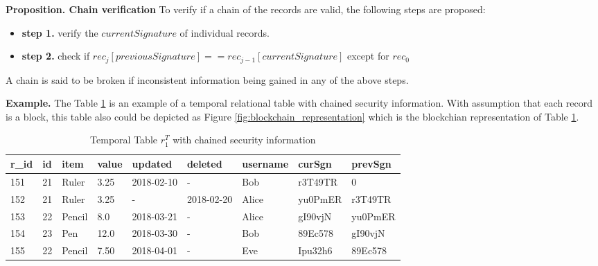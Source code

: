 \textbf{Proposition. Chain verification}
To verify if a chain of the records are valid, the following steps are proposed:

\begin{itemize}
	\item \textbf{step 1.} verify the $currentSignature$ of individual records.
	\item \textbf{step 2.} check if $rec_j[previousSignature] == rec_{j-1}[currentSignature]$ except for $rec_0$
\end{itemize}

A chain is said to be broken if inconsistent information being gained in any of the above steps.

\textbf{Example.} The Table \ref{temporal_blockchain_table} is an example of a temporal relational table with chained security information. With assumption that each record is a block, this table also could be depicted as Figure \ref{fig:blockchain_representation} which is the blockchian representation of Table \ref{temporal_blockchain_table}.

\begin{center}
\begin{table}
	\centering
	\footnotesize
	\caption{Temporal Table $r_1^T$ with chained security information}
	\label{temporal_blockchain_table}
	\begin{tabular}{p{0.5cm}p{0.5cm}p{1cm}p{0.5cm}p{1.7cm}p{1.7cm}p{1.5cm}p{1.5cm}p{1.5cm}}
		\hline
		r\_id & id & item      & value  & updated  & deleted & username & curSgn & prevSgn \\ \hline
		151& 21 & Ruler    & 3.25  & 2018-02-10  &  - & Bob &r3T49TR & 0\\  
		152& 21 & Ruler    & 3.25  & -  &  2018-02-20 & Alice & yu0PmER & r3T49TR\\
		153& 22 & Pencil    & 8.0  & 2018-03-21  &  - & Alice & gI90vjN & yu0PmER\\
		154& 23 & Pen    & 12.0  & 2018-03-30  &  - & Bob & 89Ec578 & gI90vjN\\
		155& 22 & Pencil & 7.50  & 2018-04-01 & - & Eve & Ipu32h6 & 89Ec578\\ \hline
	\end{tabular}
\end{table} 
\end{center}

